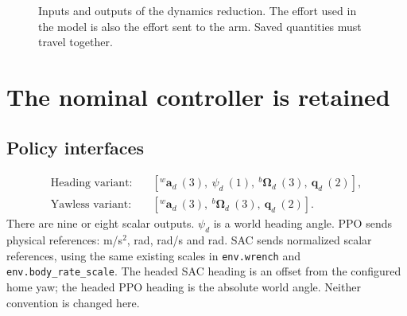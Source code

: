 \documentclass[11pt,a4paper]{article}
\newcommand{\vct}[1]{\boldsymbol{#1}}
\newcommand{\mat}[1]{\mathbf{#1}}
\newcommand{\bv}[1]{{}^{b}\vct{#1}}
\newcommand{\wv}[1]{{}^{w}\vct{#1}}
\newcommand{\Rw}{{}^{w}\mat R_b}
\begin{document}
\begin{figure}[H]
\centering
{}
\caption{Inputs and outputs of the dynamics reduction. The effort used in the
model is also the effort sent to the arm. Saved quantities must travel together.}
\label{fig:model}
\end{figure}

\section{The nominal controller is retained}\label{sec:nominal}

\subsection{Policy interfaces}
\begin{equation}
\begin{aligned}
\text{Heading variant}:\quad&
[\wv a_d\ (3),\ \psi_d\ (1),\ \bv\Omega_d\ (3),\ \vct q_d\ (2)],\\
\text{Yawless variant}:\quad&
[\wv a_d\ (3),\ \bv\Omega_d\ (3),\ \vct q_d\ (2)].
\end{aligned}\label{eq:actions}
\end{equation}
There are nine or eight scalar outputs. $\psi_d$ is a world heading angle.
PPO sends physical references: m/s$^2$, rad, rad/s and rad.
SAC sends normalized scalar references, using the same existing scales in
\texttt{env.wrench} and \texttt{env.body\_rate\_scale}.
The headed SAC heading is an offset from the configured home yaw; the headed
PPO heading is the absolute world angle. Neither convention is changed here.
\end{document}
